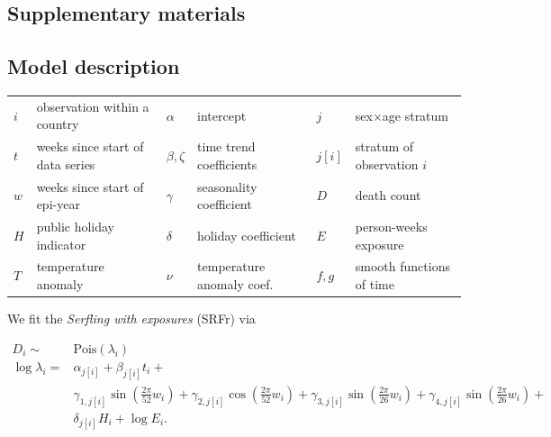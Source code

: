 \documentclass[12pt]{article}
\begin{document}
\clearpage




\clearpage


\renewcommand\thefigure{S.\arabic{figure}}
\setcounter{figure}{0}

\begin{appendix}

\section*{Supplementary materials}

\subsection*{Model description}

\begin{tabular}{llllll}
$i$ & observation within a country & $\alpha$ & intercept & $j$ & sex$\times$age stratum \\
$t$ & weeks since start of data series & $\beta, \zeta$ & time trend coefficients & $j[i]$ & stratum of observation $i$ \\
$w$ & weeks since start of epi-year & $\gamma$ & seasonality coefficient & $D$ & death count \\
$H$ & public holiday indicator & $\delta$ & holiday coefficient & $E$ & person-weeks exposure \\
$T$ & temperature anomaly & $\nu$ & temperature anomaly coef. & $f,g$ & smooth functions of time
\end{tabular}

\vspace{1em}

We fit the \emph{Serfling with exposures} (SRFr) via

\begin{equation}
\begin{aligned}
  D_i \sim& \text{Pois}(\lambda_i) \\
  \log \lambda_i =& \alpha_{j[i]} + \beta_{j[i]}t_i + \\
& \gamma_{1,j[i]}\sin\left(\frac{2\pi}{52}w_i\right) +
  \gamma_{2,j[i]}\cos\left(\frac{2\pi}{52}w_i\right) +
  \gamma_{3,j[i]}\sin\left(\frac{2\pi}{26}w_i\right) +
  \gamma_{4,j[i]}\sin\left(\frac{2\pi}{26}w_i\right) + \\
 & \delta_{j[i]}H_i + \log E_i.
\end{aligned}
\label{eq:srfr}
\end{equation}


\end{appendix}
\end{document}
